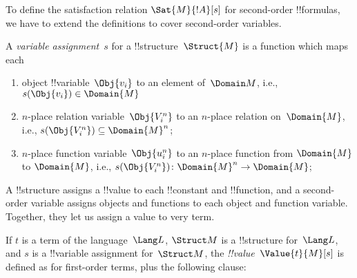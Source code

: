 \documentclass[../../../include/open-logic-section]{subfiles}
\begin{document}


\begin{explain}
To define the satisfaction relation $\Sat{M}{!A}[s]$ for second-order
!!{formula}s, we have to extend the definitions to cover second-order
variables.  
\end{explain}

\begin{defn}
A \emph{variable assignment}~$s$ for a !!{structure}~$\Struct{M}$ is a
function which maps each
\begin{enumerate}
\item object !!{variable}~$\Obj{v_i}$ to an element of~$\Domain M$,
  i.e., $s(\Obj{v_i}) \in \Domain{M}$
\item $n$-place relation variable~$\Obj{V_i^n}$ to an $n$-place
  relation on~$\Domain{M}$, i.e., $s(\Obj{V_i^n}) \subseteq \Domain{M}^n$;
\item $n$-place function variable~$\Obj{u_i^n}$ to an $n$-place
  function from $\Domain{M}$ to $\Domain{M}$, i.e.,
  $s(\Obj{V_i^n})\colon \Domain{M}^n \to \Domain{M}$;
\end{enumerate}
\end{defn}

\begin{explain}
A !!{structure} assigns a !!{value} to each !!{constant} and
!!{function}, and a second-order variable assigns objects and
functions to each object and function variable. Together, they let us
assign a value to very term.
\end{explain}

\begin{defn}
If $t$ is a term of the language~$\Lang L$, $\Struct M$ is a
!!{structure} for~$\Lang L$, and $s$ is a !!{variable} assignment
for~$\Struct M$, the \emph{!!{value}}~$\Value{t}{M}[s]$ is defined as
for first-order terms, plus the following clause:
\begin{quote}
\end{quote}
\end{defn}
\end{document}
